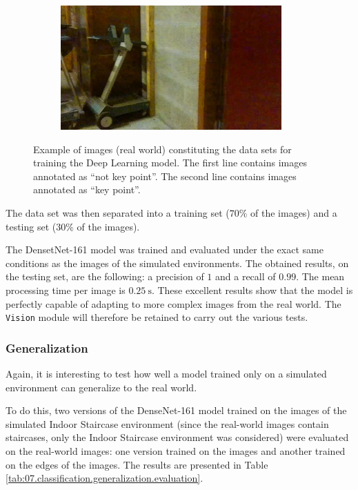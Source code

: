 \begin{figure}[H]
\begin{subfigure}{0.32\textwidth}
    \end{subfigure}
    \hfill
    \begin{subfigure}{0.32\textwidth}
        \centering
        \includegraphics[width=\textwidth]{resources/png/07/classification/datasets/5.png}
    \end{subfigure}
    \caption{Example of images (real world) constituting the data sets for training the Deep Learning model. The first line contains images annotated as \enquote{not key point}. The second line contains images annotated as \enquote{key point}.}
    \label{fig:07.classification.data.set.examples}
\end{figure}

The data set was then separated into a training set ($\num{70}\%$ of the images) and a testing set ($\num{30}\%$ of the images).

The DensetNet-161 model was trained and evaluated under the exact same conditions as the images of the simulated environments. The obtained results, on the testing set, are the following: a precision of $\num{1}$ and a recall of $\num{0.99}$. The mean processing time per image is $\SI{0.25}{\second}$. These excellent results show that the model is perfectly capable of adapting to more complex images from the real world. The \texttt{Vision} module will therefore be retained to carry out the various tests.

\subsubsection{Generalization}

Again, it is interesting to test how well a model trained only on a simulated environment can generalize to the real world.

To do this, two versions of the DenseNet-161 model trained on the images of the simulated Indoor Staircase environment (since the real-world images contain staircases, only the Indoor Staircase environment was considered) were evaluated on the real-world images: one version trained on the images and another trained on the edges of the images. The results are presented in Table \ref{tab:07.classification.generalization.evaluation}.

